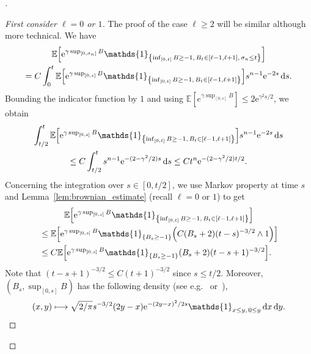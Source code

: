 \documentclass[10pt]{amsart}
\theoremstyle{definition}\newtheorem{defi}[theo]{Definition}\newtheorem{rema}[theo]{Remark}\newtheorem{exam}[theo]{Example}\newtheorem{exem}[theo]{Example}\newtheorem{nota}[theo]{Notation}
\newcommand{\e}{\mathrm{e}}
\renewcommand{\d}[1]{\mathop{}\!\mathrm{d}#1}
\newcommand{\E}{\mathbb{E}}
\newcommand\1{\mathds{1}}
\let\originalleft\left
\let\originalright\right
\renewcommand{\left}{\mathopen{}\mathclose\bgroup\originalleft}
\renewcommand{\right}{\aftergroup\egroup\originalright}
\let\oldmapsto\mapsto
\renewcommand*{\mapsto}{\mathchoice{\longmapsto}{\oldmapsto}{\oldmapsto}{\oldmapsto}}
\newenvironment{proofc}[1][\proofname]{\begin{proof}[#1]}{\end{proof}}
\begin{document}
\begin{proofc}
\begin{proof}[{First consider $\ell = 0$ or $1$}]
The proof of the case $\ell \geq 2$ will be similar although more technical. We have
\begin{multline}\label{eq:control_on_E_kl_before_tau_k_integrated_formulation}
\E \left[\e^{\gamma \sup_{[0, \sigma_n]} B} \1_{\left\{\inf_{[0, t]} B \geq -1,\, B_t \in [\ell-1, \ell+1],\, \sigma_n \leq t\right\}} \right] \\
 = C \int_0^t \E \left[\e^{\gamma \sup_{[0, s]} B} \1_{\left\{\inf_{[0, t]} B \geq -1,\, B_t \in [\ell-1, \ell+1]\right\}} \right] s^{n-1} \e^{-2s} \d{s}. 
\end{multline}
Bounding the indicator function by $1$ and using $\E[e^{\gamma \sup_{[0,s]} B}] \leq 2 \e^{\gamma^2s/2}$, we obtain
\begin{multline}\label{eq:control_on_E_kl_before_tau_k_large_s}
\int_{t/2}^t \E \left[\e^{\gamma \sup_{[0, s]} B} \1_{\left\{\inf_{[0, t]} B \geq -1,\, B_t \in [\ell-1, \ell+1]\right\}} \right] s^{n-1} \e^{-2s} \d{s} \\
\leq C \int_{t/2}^t s^{n - 1} \e^{-(2 - \gamma^2/2)s} \d{s}
\leq C t^n \e^{-(2 - \gamma^2/2)t/2}.
\end{multline}
Concerning the integration over $s \in [0, t/2]$, we use Markov property at time $s$ and Lemma~\ref{lem:brownian_estimate} (recall $\ell = 0$ or $1$) to get
\begin{multline}\label{eq:control_on_E_kl_before_tau_k_ballot}
\E \left[\e^{\gamma \sup_{[0, s]} B} \1_{\left\{\inf_{[0, t]} B \geq -1,\, B_t \in [\ell-1, \ell+1]\right\}} \right]
\\
\begin{aligned}
&\leq \E \left[\e^{\gamma \sup_{[0, s]} B} \1_{\{B_s \geq -1\}} \left(C (B_s + 2) (t - s)^{-3/2} \wedge 1 \right) \right]\\
&\leq C \E \left[\e^{\gamma \sup_{[0, s]} B} \1_{\{B_s \geq -1\}} (B_s + 2) (t - s + 1)^{-3/2} \right].
\end{aligned}
\end{multline}
Note that $(t - s + 1)^{-3/2} \leq C(t + 1)^{-3/2}$ since $s \leq t/2$. Moreover, $(B_s, \sup_{[0, s]} B)$ has the following density (see e.g.~\cite[Eq.~2]{Yor1997} or~\cite[Formula~1.1.1.8]{BorodinSalminen2002}),
\begin{equation}\label{eq:density_joint_law_brownian_motion_and_supremum}
(x, y) \mapsto \sqrt{2/\pi} s^{-3/2} (2y - x) \e^{-(2y - x)^2/2s} \1_{x \leq y,\, 0 \leq y} \d{x} \d{y}.

\end{equation}
\end{proof}
\end{proofc}
\end{document}
